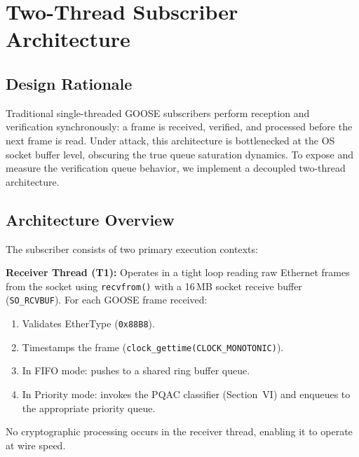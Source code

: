 \documentclass{ieeeaccess}
\begin{document}
\section{Two-Thread Subscriber Architecture}

\subsection{Design Rationale}
Traditional single-threaded GOOSE subscribers perform reception and verification synchronously: a frame is received, verified, and processed before the next frame is read. Under attack, this architecture is bottlenecked at the OS socket buffer level, obscuring the true queue saturation dynamics. To expose and measure the verification queue behavior, we implement a decoupled two-thread architecture.

\subsection{Architecture Overview}
The subscriber consists of two primary execution contexts:

\textbf{Receiver Thread (T1):} Operates in a tight loop reading raw Ethernet frames from the socket using \texttt{recvfrom()} with a 16\,MB socket receive buffer (\texttt{SO\_RCVBUF}). For each GOOSE frame received:
\begin{enumerate}[leftmargin=*]
    \item Validates EtherType (\texttt{0x88B8}).
    \item Timestamps the frame (\texttt{clock\_gettime(CLOCK\_MONOTONIC)}).
    \item In FIFO mode: pushes to a shared ring buffer queue.
    \item In Priority mode: invokes the PQAC classifier (Section~VI) and enqueues to the appropriate priority queue.
\end{enumerate}

No cryptographic processing occurs in the receiver thread, enabling it to operate at wire speed.
\end{document}
